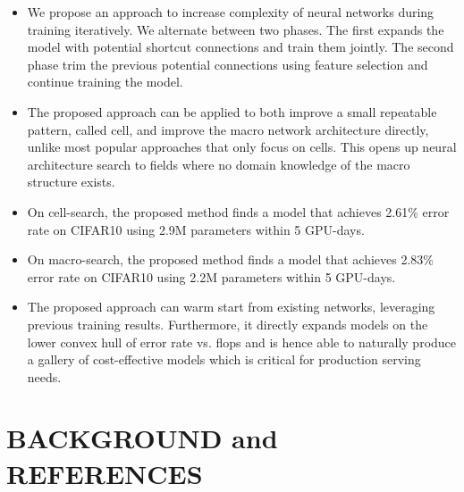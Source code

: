 \begin{itemize}
\item We propose an approach to increase complexity of neural networks during training iteratively. We alternate between two phases. The first expands the model with potential shortcut connections and train them jointly. The second phase trim the previous potential connections using feature selection and continue training the model. 
\item The proposed approach can be applied to both improve a small repeatable pattern, called cell, and improve the macro network architecture directly, unlike most popular approaches that only focus on cells. This opens up neural architecture search to fields where no domain knowledge of the macro structure exists. 
\item On cell-search, the proposed method finds a model that achieves 2.61\% error rate on CIFAR10 using 2.9M parameters within 5 GPU-days. 
\item On macro-search, the proposed method finds a model that achieves 2.83\% error rate on CIFAR10 using 2.2M parameters within 5 GPU-days. 
\item The proposed approach can warm start from existing networks, leveraging previous training results. Furthermore, it directly expands models on the lower convex hull of error rate vs. flops and is hence able to naturally produce a gallery of cost-effective models which is critical for production serving needs. 
\end{itemize}


\section{BACKGROUND and REFERENCES}
\label{sec:nas_background}

